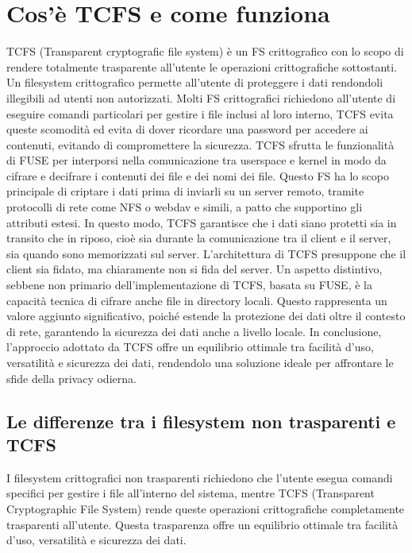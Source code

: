 \chapter{Cos’è TCFS e come funziona} 
TCFS (Transparent cryptografic file system) è un FS crittografico con lo scopo di rendere totalmente trasparente all’utente le operazioni crittografiche sottostanti. Un filesystem crittografico permette all’utente di proteggere i dati rendondoli illegibili ad utenti non autorizzati. Molti FS crittografici richiedono all’utente di eseguire comandi particolari per gestire i file inclusi al loro interno, TCFS evita queste scomodità ed evita di dover ricordare una password per accedere ai contenuti, evitando di compromettere la sicurezza. TCFS sfrutta le funzionalità di FUSE per interporsi nella comunicazione tra userspace e kernel in modo da cifrare e decifrare i contenuti dei file e dei nomi dei file. Questo FS ha lo scopo principale di criptare i dati prima di inviarli su un server remoto, tramite protocolli di rete come NFS o webdav e simili, a patto che supportino gli attributi estesi. In questo modo, TCFS garantisce che i dati siano protetti sia in transito che in riposo, cioè sia durante la comunicazione tra il client e il server, sia quando sono memorizzati sul server. L'architettura di TCFS presuppone che il client sia fidato, ma chiaramente non si fida del server. Un aspetto distintivo, sebbene non primario dell’implementazione di TCFS, basata su FUSE, è la capacità tecnica di cifrare anche file in directory locali. Questo rappresenta un valore aggiunto significativo, poiché estende la protezione dei dati oltre il contesto di rete, garantendo la sicurezza dei dati anche a livello locale. In conclusione, l’approccio adottato da TCFS offre un equilibrio ottimale tra facilità d’uso, versatilità e sicurezza dei dati, rendendolo una soluzione ideale per affrontare le sfide della privacy odierna.

\section{Le differenze tra i filesystem non trasparenti e TCFS}
I filesystem crittografici non trasparenti richiedono che l’utente esegua comandi specifici per gestire i file all’interno del sistema, mentre TCFS (Transparent Cryptographic File System) rende queste operazioni crittografiche completamente trasparenti all’utente. Questa trasparenza offre un equilibrio ottimale tra facilità d’uso, versatilità e sicurezza dei dati.

